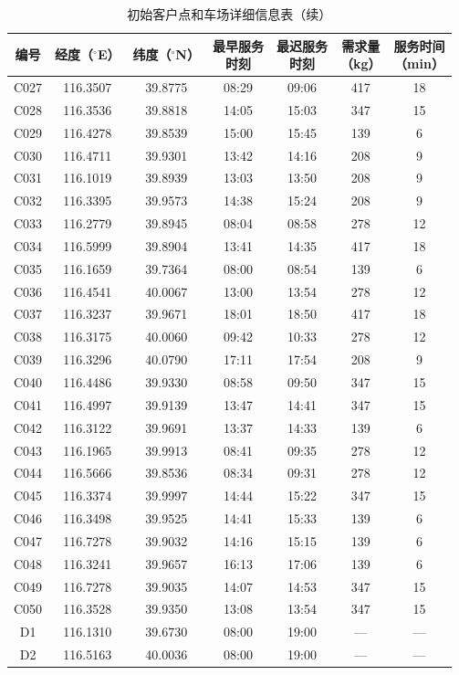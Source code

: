 \documentclass{setp-new}
\begin{document}
\begin{table}[H]
\ContinuedFloat
\centering
\caption[]{初始客户点和车场详细信息表（续）}
\small
\renewcommand{\arraystretch}{0.88}
\setlength{\tabcolsep}{1.2pt}
\begin{tabular*}{\textwidth}{@{\extracolsep{\fill}}ccccccc@{}}
\toprule
编号 & 经度（$^{\circ}$E） & 纬度（$^{\circ}$N） & \makecell{最早服务\\时刻} & \makecell{最迟服务\\时刻} & \makecell{需求量\\（kg）} & \makecell{服务时间\\（min）}\\
\midrule
C027 & 116.3507 & 39.8775 & 08:29 & 09:06 & 417 & 18\\
C028 & 116.3536 & 39.8818 & 14:05 & 15:03 & 347 & 15\\
C029 & 116.4278 & 39.8539 & 15:00 & 15:45 & 139 & 6\\
C030 & 116.4711 & 39.9301 & 13:42 & 14:16 & 208 & 9\\
C031 & 116.1019 & 39.8939 & 13:03 & 13:50 & 208 & 9\\
C032 & 116.3395 & 39.9573 & 14:38 & 15:24 & 208 & 9\\
C033 & 116.2779 & 39.8945 & 08:04 & 08:58 & 278 & 12\\
C034 & 116.5999 & 39.8904 & 13:41 & 14:35 & 417 & 18\\
C035 & 116.1659 & 39.7364 & 08:00 & 08:54 & 139 & 6\\
C036 & 116.4541 & 40.0067 & 13:00 & 13:54 & 278 & 12\\
C037 & 116.3237 & 39.9671 & 18:01 & 18:50 & 417 & 18\\
C038 & 116.3175 & 40.0060 & 09:42 & 10:33 & 278 & 12\\
C039 & 116.3296 & 40.0790 & 17:11 & 17:54 & 208 & 9\\
C040 & 116.4486 & 39.9330 & 08:58 & 09:50 & 347 & 15\\
C041 & 116.4997 & 39.9139 & 13:47 & 14:41 & 347 & 15\\
C042 & 116.3122 & 39.9691 & 13:37 & 14:33 & 139 & 6\\
C043 & 116.1965 & 39.9913 & 08:41 & 09:35 & 278 & 12\\
C044 & 116.5666 & 39.8536 & 08:34 & 09:31 & 278 & 12\\
C045 & 116.3374 & 39.9997 & 14:44 & 15:22 & 347 & 15\\
C046 & 116.3498 & 39.9525 & 14:41 & 15:33 & 139 & 6\\
C047 & 116.7278 & 39.9032 & 14:16 & 15:15 & 139 & 6\\
C048 & 116.3241 & 39.9657 & 16:13 & 17:06 & 139 & 6\\
C049 & 116.7278 & 39.9035 & 14:07 & 14:53 & 347 & 15\\
C050 & 116.3528 & 39.9350 & 13:08 & 13:54 & 347 & 15\\
D1 & 116.1310 & 39.6730 & 08:00 & 19:00 & --- & ---\\
D2 & 116.5163 & 40.0036 & 08:00 & 19:00 & --- & ---\\
\bottomrule
\end{tabular*}
\end{table}
\end{document}
